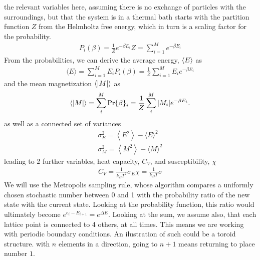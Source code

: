 \documentclass[10pt, twocolumn]{revtex4-1}
\begin{document}
the relevant variables here, assuming there is no exchange of particles with the surroundings, but that the system is in a thermal bath starts with
the partition function $Z$ from the Helmholtz free energy, which in turn is a scaling factor for the probability.
\begin{align*}
    P _ { i } ( \beta ) = \frac { 1 } { Z }e ^ { - \beta E _ { i } }
    Z = \sum _ { i = 1 } ^ { M } e ^ { - \beta E _ { i } }
\end{align*}
From the probabilities, we can derive the average energy, $\ev{E}$ as
\begin{align*}
    \langle E \rangle = \sum _ { i = 1 } ^ { M } E _ { i } P _ { i } ( \beta ) = \frac { 1 } { Z } \sum _ { i = 1 } ^ { M } E _ { i } e ^ { - \beta E _ { i } }
\end{align*}
and the mean magnetization $\ev{|M|}$ as
\begin{align*}
    \ev{|M|} = \sum_i^M \Pr{\beta}_i = \frac{1}{Z} \sum_i^M |M_i| e^{-\beta E_i }.
\end{align*}
as well as a connected set of variances
\begin{align*}
    \sigma _ { E } ^ { 2 } = \left\langle E ^ { 2 } \right\rangle - \langle E \rangle ^ { 2 } \\
\sigma_{M }^{ 2 } = \left\langle M^{ 2 } \right\rangle - \langle M \rangle^{ 2 }
\end{align*}
leading to 2 further variables, heat capacity, $C_V$,  and susceptibility, $\chi$
\begin{align*}
    C _ { V } = \frac { 1 } { k _ { B } T ^ { 2 } } \sigma_E
    \chi = \frac { 1 } { k _ { B } T } \sigma
\end{align*}
We will use the Metropolis sampling rule, whose algorithm compares a uniformly chosen stochastic number between 0 and 1 with the probability ratio
of the new state with the current state. Looking at the probability function, this ratio would ultimately become $e^{e_i - E_{i+1}}= e^{\Delta E }$.
Looking at the sum, we assume also, that each lattice point is connected to 4 others, at all times. This means we are working with periodic boundary
conditions. An ilustration of such could be a toroid structure. with $n$ elements in a direction, going to $n+1$ means returning to place number $1$.
\end{document}
